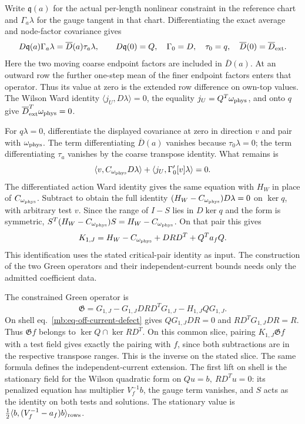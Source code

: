 \documentclass[11pt,letterpaper,reqno]{amsart}
\numberwithin{equation}{section}
\renewcommand{\eqref}[1]{\textup{eq.~\ref{#1}}}
\theoremstyle{definition}
\theoremstyle{remark}
\begin{document}
Write \(\mathfrak q(a)\) for the actual per-length nonlinear constraint in the reference chart and \(\Gamma_a\lambda\) for the gauge tangent in that chart. Differentiating the exact average and node-factor covariance gives
\[
 D\mathfrak q(a)\Gamma_a\lambda
     =\overline D(a)\tau_a\lambda,\qquad
 D\mathfrak q(0)=Q,\quad \Gamma_0=D,\quad
 \tau_0=q,\quad \overline D(0)=\overline D_{\rm ext}.
\]
Here the two moving coarse endpoint factors are included in \(\overline D(a)\). At an outward row the further one-step mean of the finer endpoint factors enters that operator. Thus its value at zero is the extended row difference on own-top values. The Wilson Ward identity \(\langle j_U,D\lambda\rangle=0\), the equality \(j_U=Q^T\omega_{\rm phys}\), and onto \(q\) give \(\overline D_{\rm ext}^T\omega_{\rm phys}=0\).

For \(q\lambda=0\), differentiate the displayed covariance at zero in direction \(v\) and pair with \(\omega_{\rm phys}\). The term differentiating \(\overline D(a)\) vanishes because \(\tau_0\lambda=0\); the term differentiating \(\tau_a\) vanishes by the coarse transpose identity. What remains is
\[
 \langle v,C_{\omega_{\rm phys}}D\lambda\rangle
   +\langle j_U,\Gamma'_0[v]\lambda\rangle=0.
\]
The differentiated action Ward identity gives the same equation with \(H_W\) in place of \(C_{\omega_{\rm phys}}\). Subtract to obtain the full identity \((H_W-C_{\omega_{\rm phys}})D\lambda=0\) on \(\ker q\), with arbitrary test \(v\). Since the range of \(I-S\) lies in \(D\ker q\) and the form is symmetric, \(S^T(H_W-C_{\omega_{\rm phys}})S=H_W-C_{\omega_{\rm phys}}\). On that pair this gives
\[
 K_{1,J}=H_W-C_{\omega_{\rm phys}}+DRD^T+Q^Ta_fQ .
\]
This identification uses the stated critical-pair identity as input. The construction of the two Green operators and their independent-current bounds needs only the admitted coefficient data.

The constrained Green operator is
\[
 \mathfrak G=G_{1,J}-G_{1,J}DRD^TG_{1,J}-H_{1,J}QG_{1,J}.
\]
On shell \eqref{mb:eq-off-current-defect} gives \(QG_{1,J}DR=0\) and \(RD^TG_{1,J}DR=R\). Thus \(\mathfrak G f\) belongs to \(\ker Q\cap\ker RD^T\). On this common slice, pairing \(K_{1,J}\mathfrak G f\) with a test field gives exactly the pairing with \(f\), since both subtractions are in the respective transpose ranges. This is the inverse on the stated slice. The same formula defines the independent-current extension. The first lift on shell is the stationary field for the Wilson quadratic form on \(Qu=b,\ RD^Tu=0\): its penalized equation has multiplier \(V_f^{-1}b\), the gauge term vanishes, and \(S\) acts as the identity on both tests and solutions. The stationary value is \(\tfrac12\langle b,(V_f^{-1}-a_f)b\rangle_{\rm rows}\).
\end{document}

